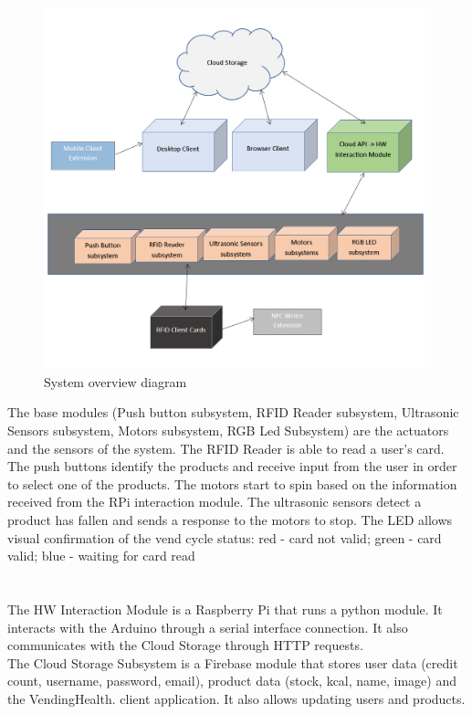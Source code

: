 \documentclass[a4paper,11pt]{article}
\begin{document}
\begin{figure}[h]
\centering
\includegraphics[scale=0.8]{SystemOverview.png}
\caption{System overview diagram}
\label{fig:system}
\end{figure}

The base modules (Push button subsystem, RFID Reader subsystem, Ultrasonic Sensors subsystem, Motors subsystem, RGB Led Subsystem) are the actuators and the sensors of the system. The RFID Reader is able to read a user's card. The push buttons identify the products and receive input from the user in order to select one of the products. The motors start to spin based on the information received from the RPi interaction module. The ultrasonic sensors detect a product has fallen and sends a response to the motors to stop. The LED allows visual confirmation of the vend cycle status: red - card not valid; green - card valid; blue - waiting for card read\\\\\\

The HW Interaction Module is a Raspberry Pi that runs a python module. It interacts with the Arduino through a serial interface connection. It also communicates with the Cloud Storage through HTTP requests.\\ 

The Cloud Storage Subsystem is a Firebase module that stores user data (credit count, username, password, email), product data (stock, kcal, name, image) and the VendingHealth. client application. It also allows updating users and products.\\ 
\end{document}
